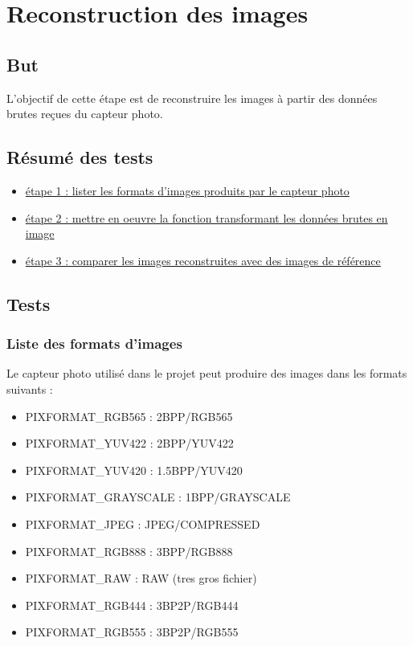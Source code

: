 \section{Reconstruction des images}

\subsection{But}
L'objectif de cette étape est de reconstruire les images à partir des données brutes reçues du capteur photo. 

\subsection{Résumé des tests}
\begin{itemize}
  \item \hyperref[sec:formats_images]{étape 1 : lister  les formats d'images produits par le capteur photo}
  \item \hyperref[sec:transformation_images]{étape 2 : mettre en oeuvre la fonction transformant les données brutes en image}
  \item \hyperref[sec:validation_images]{étape 3 : comparer les images reconstruites avec des images de référence}
\end{itemize}

\subsection{Tests}

\subsubsection{Liste des formats d'images}
\label{sec:formats_images}

Le capteur photo utilisé dans le projet peut produire des images dans les formats suivants :
\begin{itemize}
    \item PIXFORMAT\_RGB565 : 2BPP/RGB565 
    \item PIXFORMAT\_YUV422 : 2BPP/YUV422
    \item PIXFORMAT\_YUV420 : 1.5BPP/YUV420
    \item PIXFORMAT\_GRAYSCALE : 1BPP/GRAYSCALE
    \item PIXFORMAT\_JPEG : JPEG/COMPRESSED
    \item PIXFORMAT\_RGB888 : 3BPP/RGB888
    \item PIXFORMAT\_RAW : RAW (tres gros fichier)
    \item PIXFORMAT\_RGB444 : 3BP2P/RGB444
    \item PIXFORMAT\_RGB555 : 3BP2P/RGB555
\end{itemize}


